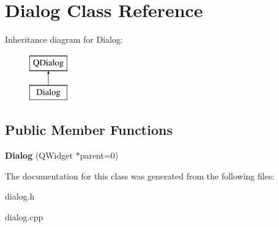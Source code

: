 \hypertarget{classDialog}{}\section{Dialog Class Reference}
\label{classDialog}
Inheritance diagram for Dialog\+:\begin{figure}[H]
\begin{center}
\leavevmode
\includegraphics[height=2.000000cm]{classDialog}
\end{center}
\end{figure}
\subsection*{Public Member Functions}
\begin{DoxyCompactItemize}
\item 
\mbox{\label{classDialog_acfa2063f9f962d394c6a645b6e7e08d8}} 
{\bfseries Dialog} (Q\+Widget $\ast$parent=0)
\end{DoxyCompactItemize}


The documentation for this class was generated from the following files\+:\begin{DoxyCompactItemize}
\item 
dialog.\+h\item 
dialog.\+cpp\end{DoxyCompactItemize}
